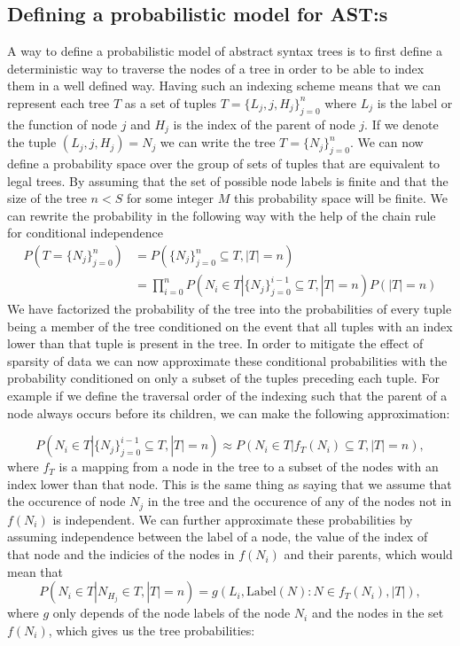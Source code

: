 \subsection{Defining a probabilistic model for AST:s}
A way to define a probabilistic model of abstract syntax trees is to first define a deterministic way to traverse the nodes of a tree in order to be able to index them in a well defined way. Having such an indexing scheme means that we can represent each tree $T$ as a set of tuples $T=\{L_j, j, H_j\}_{j=0}^n$ where $L_j$ is the label or the function of node $j$ and $H_j$ is the index of the parent of node $j$. If we denote the tuple $(L_j, j, H_j) = N_j$ we can write the tree $T=\{N_j\}_{j=0}^n$. We can now define a probability space over the group of sets of tuples that are equivalent to legal trees. By assuming that the set of possible node labels is finite and that the size of the tree $n<S$ for some integer $M$ this probability space will be finite. We can rewrite the probability in the following way with the help of the chain rule for conditional independence
\begin{equation}
\begin{split}
    P(T=\{N_j\}_{j=0}^n) & = P(\{N_j\}_{j=0}^n \subseteq T, |T|=n)\\
    & = \prod_{i=0}^{n} P(N_i\in T | \{N_j\}_{j=0}^{i-1}\subseteq T, |T|=n)P(|T|=n)
\end{split}
\end{equation}
We have factorized the probability of the tree into the probabilities of every tuple being a member of the tree conditioned on the event that all tuples with an index lower than that tuple is present in the tree. In order to mitigate the effect of sparsity of data we can now approximate these conditional probabilities with the probability conditioned on only a subset of the tuples preceding each tuple. For example if we define the traversal order of the indexing such that the parent of a node always occurs before its children, we can make the following approximation:

\begin{equation*}
P(N_i\in T | \{N_j\}_{j=0}^{i-1}\subseteq T, |T|=n) \approx 
P(N_i\in T | f_T(N_i) \subseteq T, |T|=n) ,
\end{equation*}
where $f_T$ is a mapping from a node in the tree to a subset of the nodes with an index lower than that node. This is the same thing as saying that we assume that the occurence of node $N_j$ in the tree and the occurence of any of the nodes not in $f(N_i)$ is independent.
We can further approximate these probabilities by assuming independence between the label of a node, the value of the index of that node and the indicies of the nodes in $f(N_i)$ and their parents, which would mean that  
\begin{equation*}
P(N_i\in T | N_{H_j} \in T, |T|=n) = g(L_i, \text{Label} (N):N\in f_T(N_i), |T|),
\end{equation*}
where $g$ only depends of the node labels of the node $N_i$ and the nodes in the set $f(N_i)$, which gives us the tree probabilities: 

